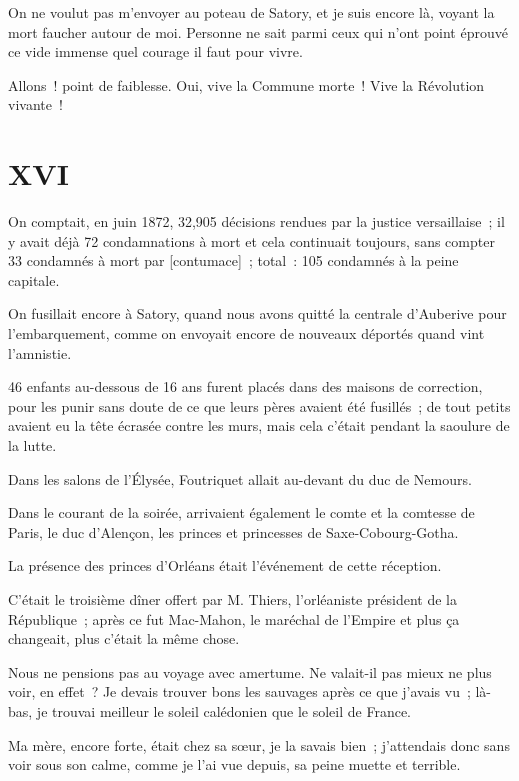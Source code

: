 \documentclass[french,twoside]{book} %
\newcommand\corr[1]{#1}
\newcommand\chapteropen{} %
\newcommand\chaptercont{} %
\newcommand\chapterclose{} %
\begin{document}
\noindent On ne voulut pas m’envoyer au poteau de Satory, et je suis encore là, voyant la mort faucher autour de moi. Personne ne sait parmi ceux qui n’ont point éprouvé ce vide immense quel courage il faut pour vivre.\par
Allons ! point de faiblesse. Oui, vive la Commune morte ! Vive la Révolution vivante !
\chapterclose


\chapteropen
 \chapter[{XVI}]{XVI}
\label{p1.16}

\chaptercont
\noindent On comptait, en juin 1872, 32,905 décisions rendues par la justice versaillaise ; il y avait déjà 72 condamnations à mort et cela continuait toujours, sans compter 33 condamnés à mort par [{\corr contumace}] ; total : 105 condamnés à la peine capitale.\par
On fusillait encore à Satory, quand nous avons quitté la centrale d’Auberive pour l’embarquement, comme on envoyait encore de nouveaux déportés quand vint l’amnistie.\par
46 enfants au-dessous de 16 ans furent placés dans des maisons de correction, pour les punir sans doute de ce que leurs pères avaient été fusillés ; de tout petits avaient eu la tête écrasée contre les murs, mais cela c’était pendant la saoulure de la lutte.\par
Dans les salons de l’Élysée, Foutriquet allait au-devant du duc de Nemours.\par
Dans le courant de la soirée, arrivaient également  le comte et la comtesse de Paris, le duc d’Alençon, les princes et princesses de Saxe-Cobourg-Gotha.\par
La présence des princes d’Orléans était l’événement de cette réception.\par
C’était le troisième dîner offert par M. Thiers, l’orléaniste président de la République ; après ce fut Mac-Mahon, le maréchal de l’Empire et plus ça changeait, plus c’était la même chose.\par
Nous ne pensions pas au voyage avec amertume. Ne valait-il pas mieux ne plus voir, en effet ? Je devais trouver bons les sauvages après ce que j’avais vu ; là-bas, je trouvai meilleur le soleil calédonien que le soleil de France.\par
Ma mère, encore forte, était chez sa sœur, je la savais bien ; j’attendais donc sans voir sous son calme, comme je l’ai vue depuis, sa peine muette et terrible.\par
\end{document}
